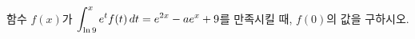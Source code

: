 \hspace*{2mm}\begin{minipage}[t]{\dimexpr\linewidth-2mm\relax}\vspace{0pt}
함수 $f(x)$가 $\displaystyle\int_{\ln 9}^{x}e^tf(t)\mkern3mu dt=e^{2x}-ae^x+9$를 만족시킬 때, $f(0)$의 값을 구하시오. \end{minipage}
